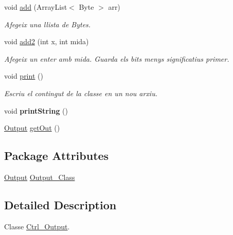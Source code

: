 \begin{DoxyCompactItemize}
void \hyperlink{classpersistencia_1_1output_1_1Ctrl__Output_a5fb2f07198a77b4fac0f95ee48e3d0b9}{add} (Array\+List$<$ Byte $>$ arr)
\begin{DoxyCompactList}\small\item\em Afegeix una llista de Bytes. \end{DoxyCompactList}\item 
void \hyperlink{classpersistencia_1_1output_1_1Ctrl__Output_ad4738467c2312b0e079c14003e548dd6}{add2} (int x, int mida)
\begin{DoxyCompactList}\small\item\em Afegeix un enter amb mida. Guarda els bits menys significatius primer. \end{DoxyCompactList}\item 
\mbox{\label{classpersistencia_1_1output_1_1Ctrl__Output_a908955c29bfecc7ebac86613bc75e9ed}} 
void \hyperlink{classpersistencia_1_1output_1_1Ctrl__Output_a908955c29bfecc7ebac86613bc75e9ed}{print} ()
\begin{DoxyCompactList}\small\item\em Escriu el contingut de la classe en un nou arxiu. \end{DoxyCompactList}\item 
\mbox{\label{classpersistencia_1_1output_1_1Ctrl__Output_a4536ad32e96d0270655a21c7c84f3bdd}} 
void {\bfseries print\+String} ()
\item 
\hyperlink{classpersistencia_1_1output_1_1Output}{Output} \hyperlink{classpersistencia_1_1output_1_1Ctrl__Output_aa36fdf4d9efc14d95f5d0d77838c6280}{get\+Out} ()
\end{DoxyCompactItemize}
\subsection*{Package Attributes}
\begin{DoxyCompactItemize}
\item 
\hyperlink{classpersistencia_1_1output_1_1Output}{Output} \hyperlink{classpersistencia_1_1output_1_1Ctrl__Output_adbfbc3bef074ccf06131270fb9fafd8d}{Output\+\_\+\+Class}
\end{DoxyCompactItemize}


\subsection{Detailed Description}
Classe \hyperlink{classpersistencia_1_1output_1_1Ctrl__Output}{Ctrl\+\_\+\+Output}. 

